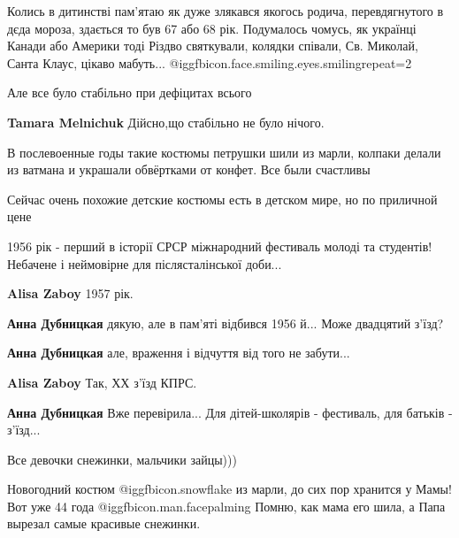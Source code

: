 \begin{itemize}
\begin{itemize}
\begin{itemize}
\end{itemize} %

\end{itemize} %


Колись в дитинстві пам'ятаю як дуже злякався якогось родича, перевдягнутого в
дєда мороза, здається то був 67 або 68 рік. Подумалось чомусь, як українці
Канади або Америки тоді Різдво святкували, колядки співали, Св. Миколай, Санта
Клаус, цікаво мабуть...  @igg{fbicon.face.smiling.eyes.smiling}{repeat=2} 

Але все було стабільно при дефіцитах всього

\textbf{Tamara Melnichuk} Дійсно,що стабільно не було нічого.


В послевоенные годы такие костюмы петрушки шили из марли, колпаки делали из
ватмана и украшали обвёртками от конфет. Все были счастливы

Сейчас очень похожие детские костюмы есть в детском мире, но по приличной цене


1956 рік - перший в історії СРСР міжнародний фестиваль молоді та студентів!
Небачене і неймовірне для післясталінської доби...

\begin{itemize} %
\textbf{Alisa Zaboy} 1957 рік.

\textbf{Анна Дубницкая} дякую, але в пам'яті відбився 1956 й... Може двадцятий з'їзд?

\textbf{Анна Дубницкая} але, враження і відчуття від того не забути...

\textbf{Alisa Zaboy} Так, ХХ з'їзд КПРС.

\textbf{Анна Дубницкая} Вже перевірила... Для дітей-школярів - фестиваль, для батьків - з'їзд...
\end{itemize} %

Все девочки снежинки, мальчики зайцы)))


Новогодний костюм @igg{fbicon.snowflake} из марли, до сих пор хранится у Мамы! Вот уже 44
года @igg{fbicon.man.facepalming}  Помню, как мама его шила, а Папа вырезал самые красивые
снежинки.


\end{itemize}

